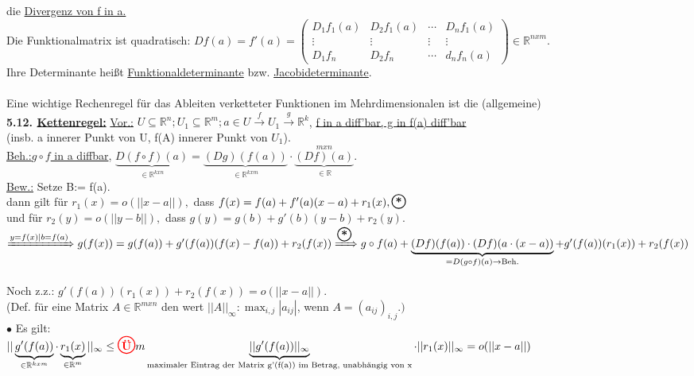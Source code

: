 \documentclass[]{scrartcl}
\newcommand{\redcircle}[1]{%
	\tikz[baseline=(char.base)]{
		\node[shape=circle, draw=red, text=red, thick, inner sep=1pt] (char) 
		{\textbf{#1}};
	}%
}
\newcommand{\blackcircle}[1]{%
	\tikz[baseline=(char.base)]{
		\node[shape=circle, draw=black, text=black, thick, inner sep=1pt] (char) 
		{\textbf{#1}};
	}%
}
\begin{document}
	die \ul{Divergenz von f in a.}\\
	Die Funktionalmatrix ist quadratisch: $Df(a)=f'(a)=\begin{pmatrix}
		D_1f_1(a)&D_2f_1(a)&\cdots&D_nf_1(a)\\
		\vdots&\vdots&\vdots&\vdots\\
		D_1f_n&D_2f_n&\cdots&d_nf_n(a)
	\end{pmatrix}\in \mathbb{R}^{n x m}.$\\
	Ihre Determinante heißt \ul{Funktionaldeterminante} bzw. \ul{Jacobideterminante}.\\
	\\
	Eine wichtige Rechenregel für das Ableiten verketteter Funktionen im Mehrdimensionalen ist die (allgemeine)\\
	\textbf{5.12. \ul{Kettenregel:}} \underline{Vor.:} $ U \subseteq\mathbb{R}^n; U_1\subseteq\mathbb{R}^m; a\in U\xrightarrow{f} U_1\xrightarrow{g}\mathbb{R}^k$, \ul{f in a diff'bar, g in f(a) diff'bar}\\
	(insb. a innerer Punkt von U, f(A) innerer Punkt von $U_1$).\\
	\underline{Beh.:}\ul{$g\circ f$ in a diffbar},  $\underbrace{D(f\circ f) (a)}_{\in\mathbb{R}^{k x n}}=\underbrace{(Dg)(f(a))}_{\in\mathbb{R}^{k x m}}\cdot \underbrace{(Df)(a)}_{\in\mathbb{R}}^{m x n}$.\\
	\underline{Bew.:} Setze B:= f(a).\\
	dann gilt für $r_1(x)=o(||x-a||),$ dass $ f(x)=f(a)+f'(a)(x-a)+r_1(x), \blackcircle{*}$\\
	und für $r_2(y)=o(||y-b||),$ dass $ g(y)=g(b)+g'(b)(y-b)+r_2(y).$\\
	$\xRightarrow{y=f(x)|b=f(a)} g(f(x))=g(f(a))+g'(f(a))(f(x)-f(a))+r_2(f(x))\\
	\xRightarrow{\blackcircle{*}}g \circ f (a)+\underbrace{(Df)(f(a))\cdot (Df)(a\cdot(x-a))}_{=D(g\circ f)(a)\rightarrow\text{Beh.}}+g'(f(a))(r_1(x))+r_2(f(x))$\\
	\\
	Noch z.z.: $g'(f(a))(r_1(x))+r_2(f(x))=o(||x-a||).$\\
	(Def. für eine Matrix $A\in \mathbb{R}^{m x n}$ den wert 
	$||A||_\infty:\max_{i,j}|a_{ij}|$, wenn $A=(a_{ij})_{i,j}.)$\\
	$\bullet$ Es gilt:\\
	$||\underbrace{g'(f(a))}_{\in\mathbb{R}^{k x m}}\cdot 
	\underbrace{r_1(x)}_{\in \mathbb{R}^m}||_\infty \leq\redcircle{Ü} 
	m\underbrace{||g'(f(a))||_\infty}_{\text{maximaler Eintrag der Matrix 
	g'(f(a)) im Betrag, unabhängig von x}}\cdot ||r_1(x)||_\infty=o(||x-a||)$ 
\end{document}
